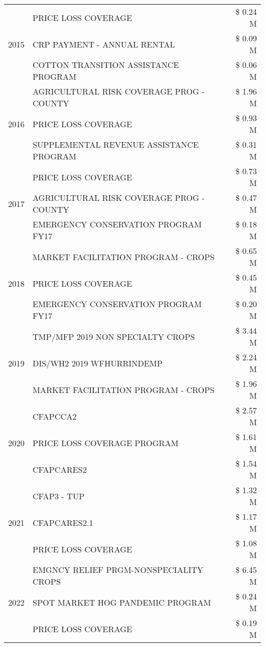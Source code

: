 \begin{tabular}{llr}
\cline{1-3}
\multirow[t]{3}{*}{2015} & PRICE LOSS COVERAGE & \$ 0.24 M \\
 & CRP PAYMENT - ANNUAL RENTAL & \$ 0.09 M \\
 & COTTON TRANSITION ASSISTANCE PROGRAM & \$ 0.06 M \\
\cline{1-3}
\multirow[t]{3}{*}{2016} & AGRICULTURAL RISK COVERAGE PROG - COUNTY & \$ 1.96 M \\
 & PRICE LOSS COVERAGE & \$ 0.93 M \\
 & SUPPLEMENTAL REVENUE ASSISTANCE PROGRAM & \$ 0.31 M \\
\cline{1-3}
\multirow[t]{3}{*}{2017} & PRICE LOSS COVERAGE & \$ 0.73 M \\
 & AGRICULTURAL RISK COVERAGE PROG - COUNTY & \$ 0.47 M \\
 & EMERGENCY CONSERVATION PROGRAM FY17 & \$ 0.18 M \\
\cline{1-3}
\multirow[t]{3}{*}{2018} & MARKET FACILITATION PROGRAM - CROPS & \$ 0.65 M \\
 & PRICE LOSS COVERAGE & \$ 0.45 M \\
 & EMERGENCY CONSERVATION PROGRAM FY17 & \$ 0.20 M \\
\cline{1-3}
\multirow[t]{3}{*}{2019} & TMP/MFP 2019 NON SPECIALTY CROPS & \$ 3.44 M \\
 & DIS/WH2 2019 WFHURRINDEMP & \$ 2.24 M \\
 & MARKET FACILITATION PROGRAM - CROPS & \$ 1.96 M \\
\cline{1-3}
\multirow[t]{3}{*}{2020} & CFAPCCA2 & \$ 2.57 M \\
 & PRICE LOSS COVERAGE PROGRAM & \$ 1.61 M \\
 & CFAPCARES2 & \$ 1.54 M \\
\cline{1-3}
\multirow[t]{3}{*}{2021} & CFAP3 - TUP & \$ 1.32 M \\
 & CFAPCARES2.1 & \$ 1.17 M \\
 & PRICE LOSS COVERAGE & \$ 1.08 M \\
\cline{1-3}
\multirow[t]{3}{*}{2022} & EMGNCY RELIEF PRGM-NONSPECIALITY CROPS & \$ 6.45 M \\
 & SPOT MARKET HOG PANDEMIC PROGRAM & \$ 0.24 M \\
 & PRICE LOSS COVERAGE & \$ 0.19 M \\
\cline{1-3}
\bottomrule
\end{tabular}
